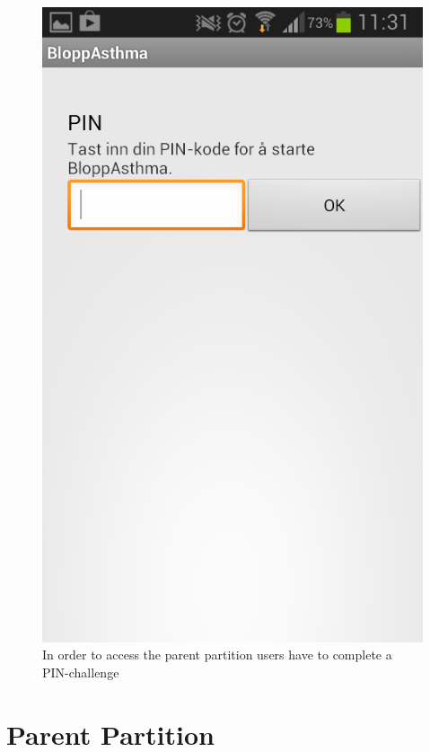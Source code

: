 \begin{figure}
\begin{minipage}[t]{0.4\linewidth}
			\includegraphics[width=0.20\paperwidth]{Pictures/new-screenshots/pin-challenge.png}
		\caption{In order to access the parent partition users have to complete a PIN-challenge}
		\label{fig:parent-pin}
	\end{minipage}
\end{figure}

\section{Parent Partition}
\label{sec:parentpartition}

